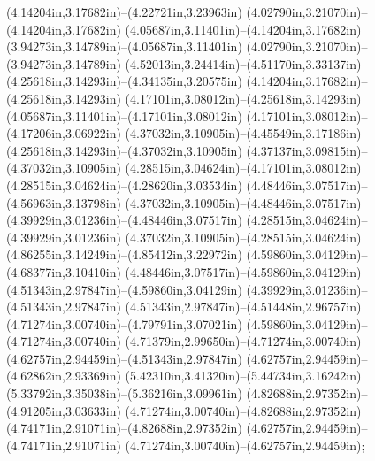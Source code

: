 (4.14204in,3.17682in)--(4.22721in,3.23963in) (4.02790in,3.21070in)--(4.14204in,3.17682in) (4.05687in,3.11401in)--(4.14204in,3.17682in) (3.94273in,3.14789in)--(4.05687in,3.11401in) (4.02790in,3.21070in)--(3.94273in,3.14789in) (4.52013in,3.24414in)--(4.51170in,3.33137in) (4.25618in,3.14293in)--(4.34135in,3.20575in) (4.14204in,3.17682in)--(4.25618in,3.14293in) (4.17101in,3.08012in)--(4.25618in,3.14293in) (4.05687in,3.11401in)--(4.17101in,3.08012in) (4.17101in,3.08012in)--(4.17206in,3.06922in) (4.37032in,3.10905in)--(4.45549in,3.17186in) (4.25618in,3.14293in)--(4.37032in,3.10905in) (4.37137in,3.09815in)--(4.37032in,3.10905in) (4.28515in,3.04624in)--(4.17101in,3.08012in) (4.28515in,3.04624in)--(4.28620in,3.03534in) (4.48446in,3.07517in)--(4.56963in,3.13798in) (4.37032in,3.10905in)--(4.48446in,3.07517in) (4.39929in,3.01236in)--(4.48446in,3.07517in) (4.28515in,3.04624in)--(4.39929in,3.01236in) (4.37032in,3.10905in)--(4.28515in,3.04624in) (4.86255in,3.14249in)--(4.85412in,3.22972in) (4.59860in,3.04129in)--(4.68377in,3.10410in) (4.48446in,3.07517in)--(4.59860in,3.04129in) (4.51343in,2.97847in)--(4.59860in,3.04129in) (4.39929in,3.01236in)--(4.51343in,2.97847in) (4.51343in,2.97847in)--(4.51448in,2.96757in) (4.71274in,3.00740in)--(4.79791in,3.07021in) (4.59860in,3.04129in)--(4.71274in,3.00740in) (4.71379in,2.99650in)--(4.71274in,3.00740in) (4.62757in,2.94459in)--(4.51343in,2.97847in) (4.62757in,2.94459in)--(4.62862in,2.93369in) (5.42310in,3.41320in)--(5.44734in,3.16242in) (5.33792in,3.35038in)--(5.36216in,3.09961in) (4.82688in,2.97352in)--(4.91205in,3.03633in) (4.71274in,3.00740in)--(4.82688in,2.97352in) (4.74171in,2.91071in)--(4.82688in,2.97352in) (4.62757in,2.94459in)--(4.74171in,2.91071in) (4.71274in,3.00740in)--(4.62757in,2.94459in);
